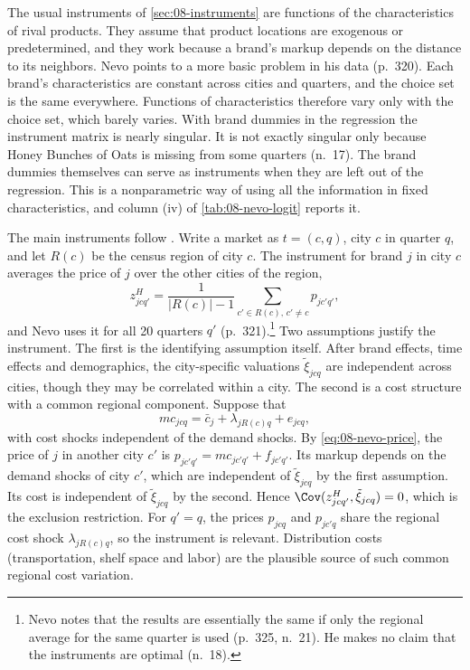  The usual instruments of \cref{sec:08-instruments}
are functions of the characteristics of rival products. They assume that product locations are exogenous or
predetermined, and they work because a brand's markup depends on the distance to its neighbors. Nevo points to
a more basic problem in his data (p.~320). Each brand's characteristics are constant across cities and
quarters, and the choice set is the same everywhere. Functions of characteristics therefore vary only with the
choice set, which barely varies. With brand dummies in the regression the instrument matrix is nearly
singular. It is not exactly singular only because Honey Bunches of Oats is missing from some quarters (n.~17).
The brand dummies themselves can serve as instruments when they are left out of the regression. This is a
nonparametric way of using all the information in fixed characteristics, and column (iv) of
\cref{tab:08-nevo-logit} reports it.

 The main instruments follow \citet{Hausman1997}. Write a market as
$t = (c, q)$, city $c$ in quarter $q$, and let $R(c)$ be the census region of city $c$. The instrument for
brand $j$ in city $c$ averages the price of $j$ over the other cities of the region,
\[
z^{H}_{j c q'} = \frac{1}{|R(c)| - 1}\sum_{c' \in R(c),\, c' \neq c} p_{j c' q'} ,
\]
and Nevo uses it for all 20 quarters $q'$ (p.~321).\footnote{Nevo notes that the results
are essentially the same if only the regional average for the same quarter is used (p.~325, n.~21). He makes
no claim that the instruments are optimal (n.~18).} Two assumptions justify the instrument. The first is the
identifying assumption itself. After brand effects, time effects and demographics, the city-specific
valuations $\tilde\xi_{jcq}$ are independent across cities, though they may be correlated within a city. The
second is a cost structure with a common regional component. Suppose that
\[
mc_{jcq} = \bar c_j + \lambda_{j R(c) q} + e_{jcq},
\]
with cost shocks independent of the demand shocks. By \cref{eq:08-nevo-price}, the price of $j$ in another
city $c'$ is $p_{jc'q'} = mc_{jc'q'} + f_{jc'q'}$. Its markup depends on the demand shocks of city $c'$, which
are independent of $\tilde\xi_{jcq}$ by the first assumption. Its cost is independent of $\tilde\xi_{jcq}$ by
the second. Hence $\Cov(z^{H}_{jcq'}, \tilde\xi_{jcq}) = 0$, which is the exclusion restriction. For $q' = q$,
the prices $p_{jcq}$ and $p_{jc'q}$ share the regional cost shock $\lambda_{jR(c)q}$, so the instrument is
relevant. Distribution costs (transportation, shelf space and labor) are the plausible source of such common
regional cost variation.

